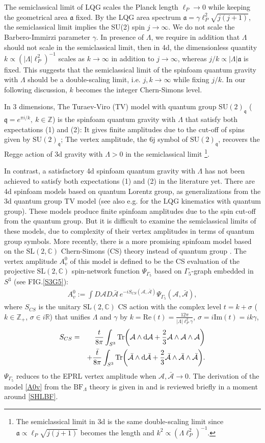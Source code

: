 \documentclass[aps,prd,notitlepage,nofootinbib,superscriptaddress,groupedaddress,twocolumn]{revtex4-1}
\def\R{\mathbb{R}}
\newcommand{\Slc}{\mathrm{SL}(2,\mathbb{C})}
\newcommand{\Su}{\mathrm{SU}(2)}
\def\be{\begin{eqnarray}}
\def\ee{\end{eqnarray}}
\newcommand{\ca}{\mathcal A}
\newcommand{\fa}{\mathfrak{a}}  \newcommand{\Fa}{\mathfrak{A}}
\newcommand{\fq}{\mathfrak{q}}  \newcommand{\Fq}{\mathfrak{Q}}
\newcommand{\g}{\gamma}
\newcommand{\G}{\Gamma}
\newcommand{\sig}{\sigma}
\renewcommand{\L }{\Lambda}
\newcommand{\rmd}{\mathrm d}
\begin{document}
The semiclassical limit of LQG scales the Planck length $\ell_P\to 0$ while keeping the geometrical area $\fa$ fixed. By the LQG area spectrum $\fa=\g \ell_P^2\sqrt{j(j+1)}$, the semiclassical limit implies the SU(2) spin $j\to\infty$. We do not scale the Barbero-Immirzi parameter $\g$. In presence of $\L$, we require in addition that $\L$ should not scale in the semiclassical limit, then in 4d, the dimensionless quantity $k\propto (|\L|\ell_P^2)^{-1}$ scales as $k\to\infty$ in addition to $j\to\infty$, whereas $j/k\propto |\L| \fa$ is fixed. This suggests that the semiclassical limit of the spinfoam quantum gravity with $\L$ should be a double-scaling limit, i.e. $j,k\to \infty$ while fixing $j/k$. In our following discussion, $k$ becomes the integer Chern-Simons level. 


In 3 dimensions, The Turaev-Viro (TV) model \cite{Turaev1992} with quantum group $\Su_\fq$ ($\fq=e^{\pi i/k},\ k\in\mathbb{Z}$) is the spinfoam quantum gravity with $\L$ that satisfy both expectations (1) and (2): It gives finite amplitudes due to the cut-off of spins given by $\Su_\fq$; The vertex amplitude, the 6j symbol of $\Su_\fq$, recovers the Regge action of 3d gravity with $\L>0$ in the semiclassical limit \cite{q6jasymp} \footnote{The semiclassical limit in 3d is the same double-scaling limit since $\fa\propto \ell_P\sqrt{j(j+1)}$ becomes the length and $k^2\propto (\L\ell_P^2)^{-1}$.}.    

In contrast, a satisfactory 4d spinfoam quantum gravity with $\L$ has not been achieved to satisfy both expectations (1) and (2) in the literature yet. There are 4d spinfoam models based on quantum Lorentz group, as generalizations from the 3d quantum group TV model \cite{NP,QSF,QSF1} (see also e.g. \cite{Dupuis:2013lka,Lewandowski:2008ye} for the LQG kinematics with quantum group). These models produce finite spinfoam amplitudes due to the spin cut-off from the quantum group. But it is difficult to examine the semiclassical limits of these models, due to complexity of their vertex amplitudes in terms of quantum group symbols. More recently, there is a more promising spinfoam model based on the $\Slc$ Chern-Simons (CS) theory instead of quantum group \cite{HHKR}. The vertex amplitude $A^0_v$ of this model is defined to be the CS evaluation of the projective $\Slc$ spin-network function $\Psi_{\G_5}$ based on $\G_5$-graph embedded in $S^3$ (see FIG.\ref{S3G5}):
\be
A^0_v:=\int D\ca D\bar{\ca}\, e^{-iS_{CS}(\ca,\bar{\ca})}\Psi_{\G_5}(\ca,\bar{\ca}),\label{A0v}
\ee
where $S_{CS}$ is the unitary $\Slc$ CS action with the complex level $t=k+\sig$ ($k\in\mathbb{Z}_+$, $\sig \in i\R$) that unifies $\L$ and $\g$ by $k=\mathrm{Re}(t)=\frac{12\pi}{|\L|\ell_P^2\g}$, $\sig=i\mathrm{Im}(t)=ik\g$,
\be
S_{CS}&=&\frac{t}{8\pi}\int_{S^3} \Tr(\ca\wedge \rmd\ca+\frac{2}{3}\ca\wedge \ca\wedge \ca)\nonumber\\
&&+\frac{\bar{t}}{8\pi}\int_{S^3} \Tr(\bar{\ca}\wedge \rmd\bar{\ca}+\frac{2}{3}\bar{\ca}\wedge \bar{\ca}\wedge \bar{\ca}).\label{CSaction}
\ee
$\Psi_{\G_5}$ reduces to the EPRL vertex amplitude \cite{EPRL} when $\ca,\bar{\ca}\to 0$. The derivation of the model \eqref{A0v} from the $\mathrm{BF}_\L$ theory is given in \cite{HHKR} and is reviewed briefly in a moment around \eqref{SHLBF}. 
\end{document}
